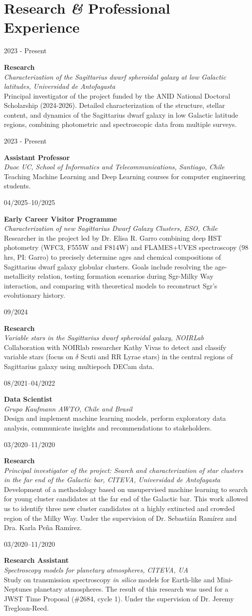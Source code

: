 \documentclass[10pt, a4paper]{article}
\newcommand{\amper}{{\itshape\addfontfeatures{Scale=.95}\&}}
\newlength{\datebox}
\newlength{\textbox}
\newcommand{\workitem}[4]{\noindent\parbox[t]{\datebox}{#1}%
    \parbox[t]{\textbox}{\textbf{\textcolor{ViridianGreen}{#2}}\\
    \textit{#3}\\\textcolor{Jet}{\small #4}}\par\vspace{0.4cm}}
\begin{document}
\section*{Research \amper{} Professional Experience}
\workitem{2023 - Present}{Research}{Characterization of the Sagittarius dwarf spheroidal galaxy at low Galactic latitudes, Universidad de Antofagasta}{Principal investigator of the project funded by the ANID National Doctoral Scholarship (2024-2026). Detailed characterization of the structure, stellar content, and dynamics of the Sagittarius dwarf galaxy in low Galactic latitude regions, combining photometric and spectroscopic data from multiple surveys.}
\workitem{2023 - Present}{Assistant Professor}{Duoc UC, School of Informatics and Telecommunications, Santiago, Chile}{Teaching Machine Learning and Deep Learning courses for computer engineering students.}
\workitem{04/2025--10/2025}{Early Career Visitor Programme}{Characterization of new Sagittarius Dwarf Galaxy Clusters, ESO, Chile}{Researcher in the project led by Dr. Elisa R. Garro combining deep HST photometry (WFC3, F555W and F814W) and FLAMES+UVES spectroscopy (98 hrs, PI: Garro) to precisely determine ages and chemical compositions of Sagittarius dwarf galaxy globular clusters. Goals include resolving the age-metallicity relation, testing formation scenarios during Sgr-Milky Way interaction, and comparing with theoretical models to reconstruct Sgr's evolutionary history.}
\workitem{09/2024}{Research }{Variable stars in the Sagittarius dwarf spheroidal galaxy, NOIRLab}{Collaboration with NOIRlab researcher Kathy Vivas to detect and classify variable stars (focus on $\delta$ Scuti and RR Lyrae stars) in the central regions of Sagittarius galaxy using multiepoch DECam data.}
\workitem{08/2021--04/2022}{Data Scientist}{Grupo Kaufmann AWTO, Chile and Brasil}{Design and implement machine learning models, perform exploratory data analysis, communicate insights and recommendations to stakeholders.}
\workitem{03/2020--11/2020}{Research}{Principal investigator of the project: Search and characterization of star clusters in the far end of the Galactic bar, CITEVA, Universidad de Antofagasta}{Development of a methodology based on unsupervised machine learning to search for young cluster candidates at the far end of the Galactic bar. This work allowed us to identify three new cluster candidates at a highly extincted and crowded region of the Milky Way. Under the supervision of Dr. Sebastián Ramírez and Dra. Karla Peña Ramírez.}
\workitem{03/2020--11/2020}{Research Assistant}{Spectroscopy models for planetary atmospheres, CITEVA, UA}{Study on transmission spectroscopy \textit{in silico} models for Earth-like and Mini-Neptunes planetary atmospheres. The result of this research was used for a JWST Time Proposal (\#2684, cycle 1). Under the supervision of Dr. Jeremy Tregloan-Reed.}
\end{document}

